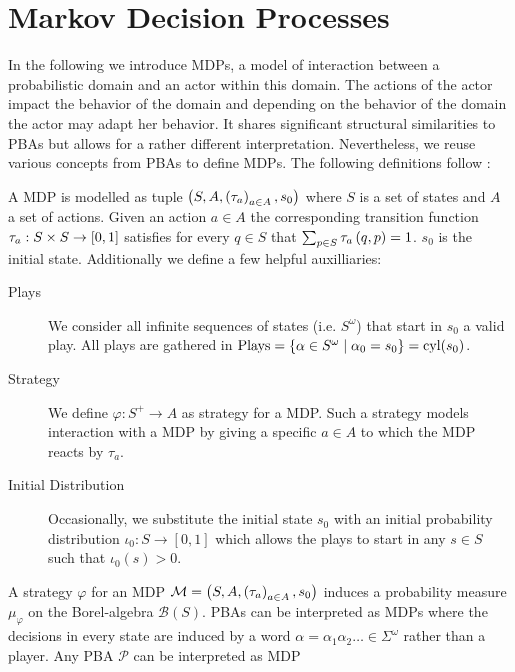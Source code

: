 \section{Markov Decision Processes}
In the following we introduce \acp{MDP}, a model of interaction between a 
probabilistic domain and an actor within this domain. The actions of the actor
impact the behavior of the domain and depending on the behavior of the domain
the actor may adapt her behavior. It shares significant structural similarities
to \acp{PBA} but allows for a rather different interpretation. Nevertheless, we
reuse various concepts from \acp{PBA} to define \acp{MDP}. The following 
definitions follow \cite{RandAutoInfTrees}:
\begin{definition}
  A \acl*{MDP} is modelled as tuple
  $\left(S, A, \left(\tau_{a}\right)_{a\in A}, s_{0}\right)$ where $S$ is a set of states
  and $A$ a set of actions. Given an action $a\in A$ the corresponding
  transition function $\tau_{a}:S\times S\rightarrow \left[0,1\right]$ satisfies
  for every $q\in S$ that $\sum_{p\in S}\tau_{a}\left(q,p\right) = 1$.
  $s_{0}$ is the initial state. Additionally we define a few helpful
  auxilliaries:
  \begin{description}
    \item [Plays] We consider all infinite sequences of states
      (i.e. $S^{\omega}$) that start in $s_{0}$ a valid play. All plays
      are gathered in $\operatorname{Plays} = \left\{
        \alpha\in S^{\omega}\mid \alpha_{0} = s_{0}\right\} = \operatorname{cyl}(s_{0})$.
    \item [Strategy] We define $\varphi:S^{+}\rightarrow A$ as strategy for
      a \ac{MDP}. Such a strategy models interaction with a \ac{MDP} by
      giving a specific $a\in A$ to which the \ac{MDP} reacts by $\tau_{a}$.
    \item [Initial Distribution] Occasionally, we substitute the initial state
      $s_{0}$ with an initial probability distribution
      $\iota_{0}:S\rightarrow[0,1]$ which allows the plays to start in any
      $s\in S$ such that $\iota_{0}(s) > 0$.
  \end{description}
  \label{def:mdp}
\end{definition}
A strategy $\varphi$ for an \ac{MDP}
$\mathcal{M} = \left(S, A, \left(\tau_{a}\right)_{a\in A}, s_{0}\right)$ induces a 
probability measure $\mu_{\varphi}$ on the Borel-algebra $\mathcal{B}(S)$. 
\acp{PBA} can be interpreted as \acp{MDP} where the decisions in every state
are induced by a word $\alpha = \alpha_{1}\alpha_{2}\dots\in\Sigma^{\omega}$
rather than a player. Any \ac{PBA} $\mathcal{P}$ can be interpreted as \ac{MDP}
